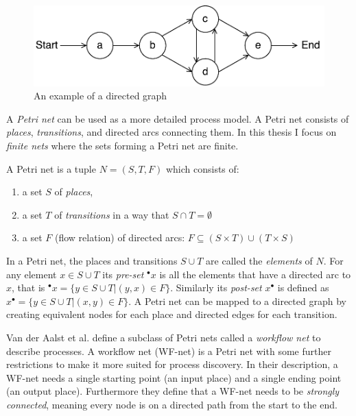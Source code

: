 \begin{figure}[htb]
\centering \includegraphics[width=0.7\linewidth]{gfx/figures/directedgraph.pdf}
\caption{An example of a directed graph}
\label{fig:directedgraph}
\end{figure}

A \emph{Petri net} \cite{rozenberg1998lectures} can be used as a more detailed process model. A Petri net consists of \emph{places}, \emph{transitions}, and directed arcs connecting them. In this thesis I focus on \emph{finite nets} where the sets forming a Petri net are finite.

\begin{definition}
A Petri net is a tuple $N = (S, T, F)$ which consists of:
\begin{enumerate}
    \item a set $S$ of \emph{places},
    \item a set $T$ of \emph{transitions} in a way that $S \cap T = \emptyset$
    \item a set $F$ (flow relation) of directed arcs: $F \subseteq (S \times T) \cup (T \times S)$ 
\end{enumerate}
\end{definition}

In a Petri net, the places and transitions $S \cup T$ are called the \emph{elements} of $N$.
For any element $x \in S \cup T$ its \emph{pre-set} ${}^\bullet x$ is all the elements that have a directed arc to $x$, that is ${}^\bullet x = \{y \in S \cup T | (y,x) \in F\}$. Similarly its \emph{post-set} $x^\bullet$ is defined as 
$x^\bullet = \{y \in S \cup T | (x,y) \in F\}$.
A Petri net can be mapped to a directed graph by creating equivalent nodes for each place and directed edges for each transition.

Van der Aalst et al. \cite{van2013discovering, van2004workflow} define a subclass of Petri nets called a \emph{workflow net} to describe processes. A workflow net (WF-net) is a Petri net with some further restrictions to make it more suited for process discovery. In their description, a WF-net needs a single starting point (an input place) and a single ending point (an output place). Furthermore they define that a WF-net needs to be \emph{strongly connected}, meaning every node is on a directed path from the start to the end.

